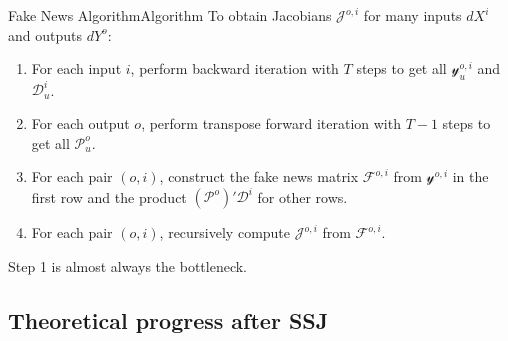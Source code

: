 \documentclass[aspectratio=169]{beamer}
\begin{document}
\begin{frame}{Fake News Algorithm}{Algorithm}
    To obtain Jacobians $\mathcal{J}^{o,i}$ for many inputs $dX^i$ and outputs $dY^o$:
    \begin{enumerate}
        \item For each input $i$, perform \textcolor{mygreen}{backward} iteration with $T$ steps to get all $\mathcal{y}_u^{o,i}$ and $\mathcal{D}_u^{i}$.
        \item For each output $o$, perform \textcolor{myorange}{transpose forward} iteration with $T-1$ steps to get all $\mathcal{P}_u^{o}$.
        \item For each pair $(o,i)$, construct \alert{the fake news matrix} $\mathcal{F}^{o,i}$ from $\mathcal{y}^{o,i}$ in the first row and the product $(\mathcal{P}^{o})'\mathcal{D}^{i}$ for other rows.
        \item For each pair $(o,i)$, recursively compute $\mathcal{J}^{o,i}$ from $\mathcal{F}^{o,i}$.
    \end{enumerate}
    \vspace{0.5em}
    \alert{Step 1} is almost always the bottleneck.
\end{frame}
\subsection{Theoretical progress after SSJ}
\end{document}
